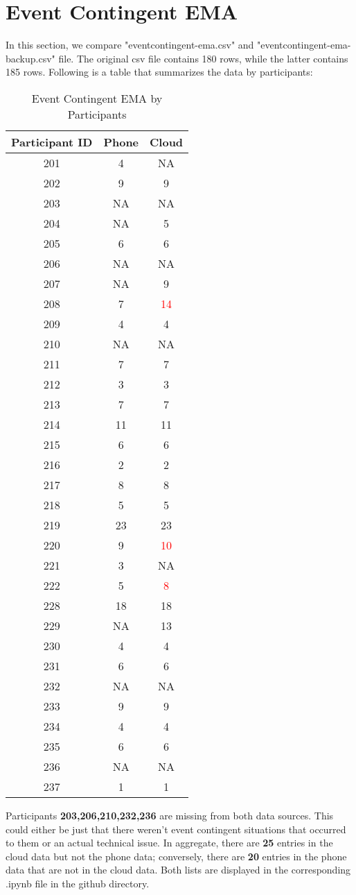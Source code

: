 \documentclass[11pt]{article}
\begin{document}
\section{Event Contingent EMA}
In this section, we compare "eventcontingent-ema.csv" and "eventcontingent-ema-backup.csv" file. The original csv file contains 180 rows, while the latter contains 185 rows. Following is a table that summarizes the data by participants:
\begin{table}[htb]
\centering
\begin{tabular}{|c|c|c|} 
 \hline
Participant ID & Phone & Cloud \\
 \hline
 201 & 4 & NA \\
 \hline
 202 &  9 & 9 \\
 \hline
 203 & NA & NA \\
 \hline
 204 & NA & 5 \\
\hline  
205 & 6 & 6 \\
\hline
206& NA & NA \\
\hline
207 & NA & 9 \\
\hline
208 & 7 & \textcolor{red}{14} \\
\hline
209 & 4 &  4 \\
\hline
210 & NA & NA \\
\hline
211 & 7 & 7 \\
\hline
212 & 3 & 3 \\
\hline
213 & 7 & 7\\
\hline
214 & 11 & 11 \\
\hline
215 & 6 & 6 \\
\hline
216 & 2 & 2\\
\hline
217 & 8 & 8 \\
\hline
218 & 5 & 5 \\
\hline
219 & 23 & 23 \\
\hline
220 & 9 & \textcolor{red}{10} \\
\hline
221 & 3 & NA \\
\hline
222 & 5 & \textcolor{red}{8} \\
\hline
228 & 18 & 18 \\
\hline
229 & NA & 13 \\
\hline
230 & 4 & 4 \\
\hline
231 & 6 & 6 \\
\hline
232 & NA & NA \\
\hline
233 & 9 & 9 \\
\hline
234 & 4 & 4 \\
\hline
235 & 6 & 6 \\
\hline
236 & NA & NA \\
\hline
237 & 1 & 1 \\
\hline
\end{tabular}
\caption{Event Contingent EMA by Participants}
\label{table:5}
\end{table}
  Participants \textbf{203,206,210,232,236} are missing from both data sources. This could either be just that there weren't event contingent situations that occurred to them or an actual technical issue. In aggregate, there are \textbf{25} entries in the cloud data but not the phone data; conversely, there are \textbf{20} entries in the phone data that are not in the cloud data.  Both lists are displayed in the corresponding .ipynb file in the github directory.
\end{document}
